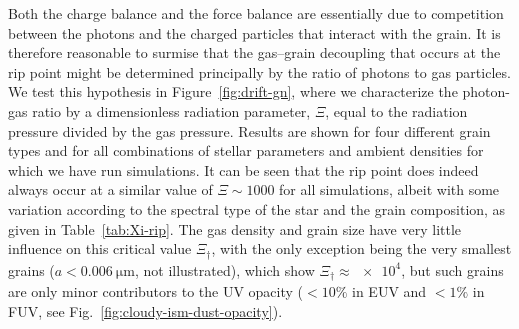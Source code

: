 Both the charge balance and the force balance are essentially due to
competition between the photons and the charged particles that
interact with the grain.  It is therefore reasonable to surmise that
the gas--grain decoupling that occurs at the rip point might be
determined principally by the ratio of photons to gas particles.  We
test this hypothesis in Figure~\ref{fig:drift-gn}, where we
characterize the photon-gas ratio by a dimensionless radiation
parameter, \(\Xi\), equal to the radiation pressure divided by the gas
pressure.  Results are shown for four different grain types and for
all combinations of stellar parameters and ambient densities for which
we have run simulations.  It can be seen that the rip point does indeed
always occur at a similar value of \(\Xi \sim 1000\) for all simulations, albeit
with some variation according to the spectral type of the star and the
grain composition, as given in Table~\ref{tab:Xi-rip}.  The gas
density and grain size have very little influence on this critical
value \(\Xi_\dag\), with the only exception being the very smallest grains
(\(a < \SI{0.006}{\um}\), not illustrated), which show
\(\Xi_\dag \approx \num{e4}\), but such grains are only minor contributors to the
UV opacity (\(< 10\%\) in EUV and \(< 1\%\) in FUV, see
Fig.~\ref{fig:cloudy-ism-dust-opacity}).

